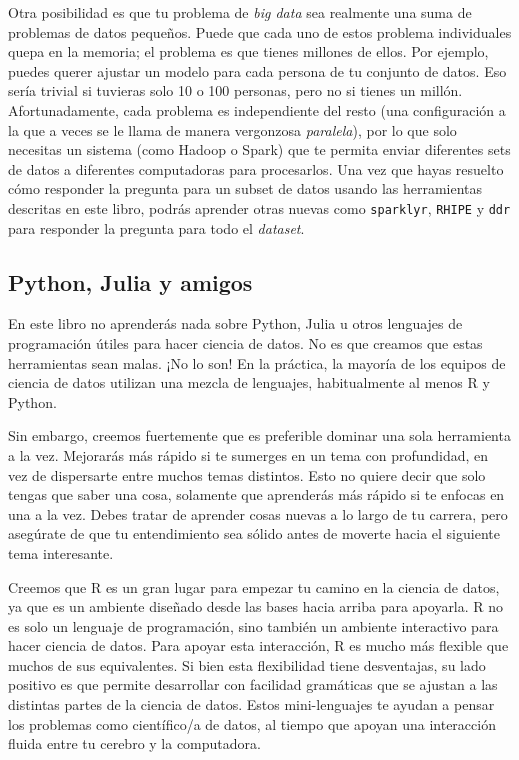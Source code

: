 \documentclass[11pt,oneside]{report}
\begin{document}
Otra posibilidad es que tu problema de \emph{big data} sea realmente una
suma de problemas de datos pequeños. Puede que cada uno de estos
problema individuales quepa en la memoria; el problema es que tienes
millones de ellos. Por ejemplo, puedes querer ajustar un modelo para
cada persona de tu conjunto de datos. Eso sería trivial si tuvieras solo
10 o 100 personas, pero no si tienes un millón. Afortunadamente, cada
problema es independiente del resto (una configuración a la que a veces
se le llama de manera vergonzosa \emph{paralela}), por lo que solo
necesitas un sistema (como Hadoop o Spark) que te permita enviar
diferentes sets de datos a diferentes computadoras para procesarlos. Una
vez que hayas resuelto cómo responder la pregunta para un subset de
datos usando las herramientas descritas en este libro, podrás aprender
otras nuevas como \texttt{sparklyr}, \texttt{RHIPE} y \texttt{ddr} para
responder la pregunta para todo el \emph{dataset}.

\hypertarget{python-julia-y-amigos}{%
\subsection{Python, Julia y amigos}\label{python-julia-y-amigos}}

En este libro no aprenderás nada sobre Python, Julia u otros lenguajes
de programación útiles para hacer ciencia de datos. No es que creamos
que estas herramientas sean malas. ¡No lo son! En la práctica, la
mayoría de los equipos de ciencia de datos utilizan una mezcla de
lenguajes, habitualmente al menos R y Python.

Sin embargo, creemos fuertemente que es preferible dominar una sola
herramienta a la vez. Mejorarás más rápido si te sumerges en un tema con
profundidad, en vez de dispersarte entre muchos temas distintos. Esto no
quiere decir que solo tengas que saber una cosa, solamente que
aprenderás más rápido si te enfocas en una a la vez. Debes tratar de
aprender cosas nuevas a lo largo de tu carrera, pero asegúrate de que tu
entendimiento sea sólido antes de moverte hacia el siguiente tema
interesante.

Creemos que R es un gran lugar para empezar tu camino en la ciencia de
datos, ya que es un ambiente diseñado desde las bases hacia arriba para
apoyarla. R no es solo un lenguaje de programación, sino también un
ambiente interactivo para hacer ciencia de datos. Para apoyar esta
interacción, R es mucho más flexible que muchos de sus equivalentes. Si
bien esta flexibilidad tiene desventajas, su lado positivo es que
permite desarrollar con facilidad gramáticas que se ajustan a las
distintas partes de la ciencia de datos. Estos mini-lenguajes te ayudan
a pensar los problemas como científico/a de datos, al tiempo que apoyan
una interacción fluida entre tu cerebro y la computadora.
\end{document}
